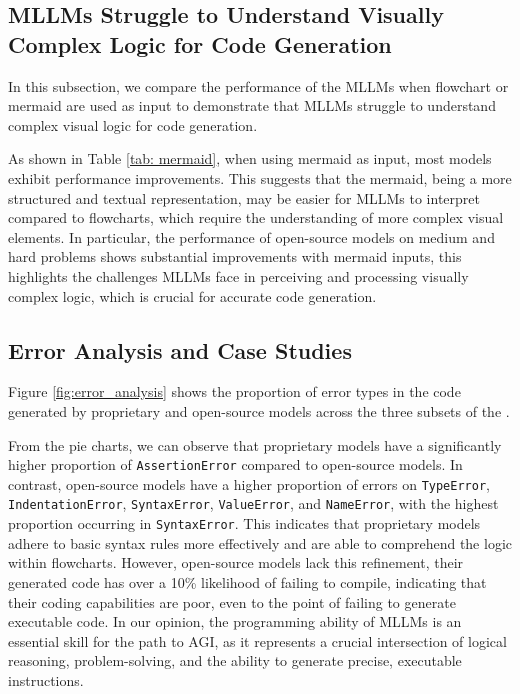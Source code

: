 

\subsection{MLLMs Struggle to Understand Visually Complex Logic for Code Generation}
In this subsection, we compare the performance of the MLLMs when flowchart or mermaid are used as input to demonstrate that MLLMs struggle to understand complex visual logic for code generation.

As shown in Table \ref{tab: mermaid}, when using mermaid as input, most models exhibit performance improvements. This suggests that the mermaid, being a more structured and textual representation, may be easier for MLLMs to interpret compared to flowcharts, which require the understanding of more complex visual elements. In particular, the performance of open-source models on medium and hard problems shows substantial improvements with mermaid inputs, this highlights the challenges MLLMs face in perceiving and processing visually complex logic, which is crucial for accurate code generation.




\subsection{Error Analysis and Case Studies}

Figure \ref{fig:error_analysis} shows the proportion of error types in the code generated by proprietary and open-source models across the three subsets of the \benchmark.

From the pie charts, we can observe that proprietary models have a significantly higher proportion of \texttt{AssertionError} compared to open-source models. In contrast, open-source models have a higher proportion of errors on \texttt{TypeError}, \texttt{IndentationError}, \texttt{SyntaxError}, \texttt{ValueError}, and \texttt{NameError}, with the highest proportion occurring in \texttt{SyntaxError}. This indicates that proprietary models adhere to basic syntax rules more effectively and are able to comprehend the logic within flowcharts. However, open-source models lack this refinement, their generated code has over a 10\% likelihood of failing to compile, indicating that their coding capabilities are poor, even to the point of failing to generate executable code. In our opinion, the programming ability of MLLMs is an essential skill for the path to AGI, as it represents a crucial intersection of logical reasoning, problem-solving,  and the ability to generate precise, executable instructions.

